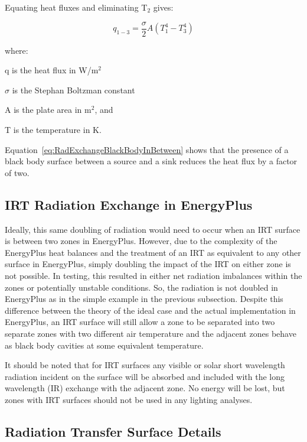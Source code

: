 Equating heat fluxes and eliminating T\(_{2}\) gives:

\begin{equation}
{q_{1 - 3}} = \frac{\sigma }{2}A\left( {T_1^4 - T_3^4} \right)
\label{eq:RadExchangeBlackBodyInBetween}
\end{equation}

where:

q is the heat flux in W/m\(^{2}\)

$\sigma$ is the Stephan Boltzman constant

A is the plate area in m\(^{2}\), and

T is the temperature in K.

Equation~\ref{eq:RadExchangeBlackBodyInBetween} shows that the presence of a black body surface between a source and a sink reduces the heat flux by a factor of two.

\subsection{IRT Radiation Exchange in EnergyPlus}\label{irt-radiation-exchange-in-energyplus}

Ideally, this same doubling of radiation would need to occur when an IRT surface is between two zones in EnergyPlus. However, due to the complexity of the EnergyPlus heat balances and the treatment of an IRT as equivalent to any other surface in EnergyPlus, simply doubling the impact of the IRT on either zone is not possible.  In testing, this resulted in either net radiation imbalances within the zones or potentially unstable conditions. So, the radiation is not doubled in EnergyPlus as in the simple example in the previous subsection. Despite this difference between the theory of the ideal case and the actual implementation in EnergyPlus, an IRT surface will still allow a zone to be separated into two separate zones with two different air temperature and the adjacent zones behave as black body cavities at some equivalent temperature.

It should be noted that for IRT surfaces any visible or solar short wavelength radiation incident on the surface will be absorbed and included with the long wavelength (IR) exchange with the adjacent zone. No energy will be lost, but zones with IRT surfaces should not be used in any lighting analyses.

\subsection{Radiation Transfer Surface Details}\label{radiation-transfer-surface-details}

